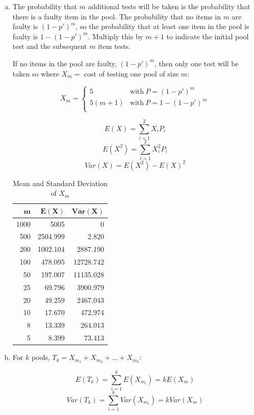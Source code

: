 \documentclass[11pt]{extarticle}
\begin{document}
\begin{enumerate}[(a)]
\item 

The probability that $m$ additional tests will be taken is the probability that there is a faulty item in the pool. The probability that no items in $m$ are faulty is $(1-p')^m$, so the probability that at least one item in the pool is faulty is $1-(1-p')^m$. Multiply this by $m+1$ to indicate the initial pool test and the subsequent $m$ item tests. 

If no items in the pool are faulty, $(1-p')^m$, then only one test will be taken so where $X_m = $ cost of testing one pool of size $m$:

$$X_m = \begin{cases} 
5 & \text{with}\ P=(1-p')^m \\
5(m+1) & \text{with}\  P=1 - (1-p')^m  \\
\end{cases}$$


$$E(X) = \sum_{i=1}^2 X_i P_i$$
$$E(X^2) = \sum_{i=1}^2 X_i^2 P_i$$
$$Var(X) = E(X^2) - E(X)^2$$



\begin{table}[H]
\caption{Mean and Standard Deviation of $X_m$}
\centering
\begin{tabular}{rrr}
\toprule
$\mathbf{m}$  & $\mathbf{E(X)}$ & $\mathbf{Var(X)}$ \\
\midrule
1000	&	5005	&	0	\\
500	&	2504.999	&	2.820	\\
200	&	1002.104	&	2887.190	\\
100	&	478.095	&	12728.742	\\
50	&	197.007	&	11135.028	\\
25	&	69.796	&	3900.979	\\
20	&	49.259	&	2467.043	\\
10	&	17.670	&	472.974	\\
8	&	13.339	&	264.013	\\
5	&	8.399	&	73.413	\\
\bottomrule
\end{tabular}
\end{table}

\item

For $k$ pools, $T_k = X_{m_1} + X_{m_2} + \dots + X_{m_k}$:

$$E(T_k) = \sum_{i=1}^k E(X_{m_i}) = k E(X_m)$$
$$Var(T_k) = \sum_{i=1}^k Var(X_{m_i}) = k Var(X_m)$$






\end{enumerate}
\end{document}
